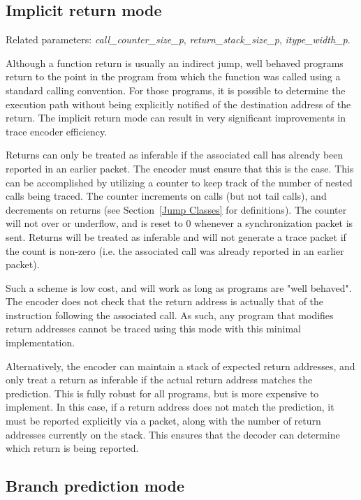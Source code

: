 \subsection{Implicit return mode} \label{sec:implicit-return}

Related parameters: \textit{call\_counter\_size\_p}, \textit{return\_stack\_size\_p}, \textit{itype\_width\_p}.

Although a function return is usually an indirect jump, well behaved programs return to the
point in the program from which the function was called using a standard calling convention.
For those programs, it is possible to determine the execution path without being explicitly notified
of the destination address of the return.  The implicit return mode can result in very
significant improvements in trace encoder efficiency.

Returns can only be treated as inferable if the associated call has already been reported in
an earlier packet.  The encoder must ensure that this is the case.  This can be accomplished
by utilizing a counter to keep track of the number of nested calls being traced.  The counter
increments on calls (but not tail calls), and decrements on returns (see Section~\ref{Jump Classes}
for definitions).  The counter will not over or underflow, and is reset to 0 whenever a
synchronization packet is sent.  Returns will be treated as inferable and will not generate a trace
packet if the count is non-zero (i.e. the associated call was already reported in an earlier packet).

Such a scheme is low cost, and will work as long as programs are "well behaved".  The encoder does not check that the
return address is actually that of the instruction following the associated call.  As such, any program that
modifies return addresses cannot be traced using this mode with this minimal implementation.

Alternatively, the encoder can maintain a stack of expected return addresses, and only treat a
return as inferable if the actual return address matches the prediction.  This is fully robust for all
programs, but is more expensive to implement.  In this case, if a return address does not match the prediction, 
it must be reported explicitly via a packet, along with the number of return addresses
currently on the stack.  This ensures that the decoder can determine which return is being reported. 

\subsection{Branch prediction mode} \label{sec:branch-prediction}

